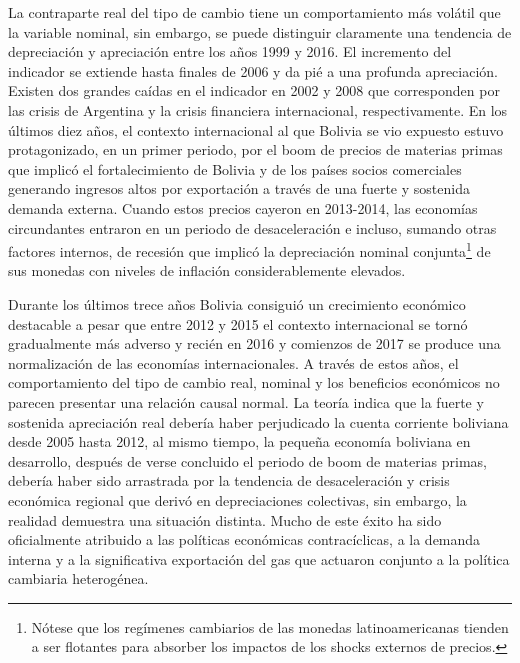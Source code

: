 \documentclass[12pt,letterpaper]{article}
\begin{document}
La contraparte real del tipo de cambio tiene un comportamiento más volátil que la variable nominal, sin embargo, se puede distinguir claramente una tendencia de depreciación y apreciación entre los años 1999 y 2016. El incremento del indicador se extiende hasta finales de 2006 y da pié a una profunda apreciación. Existen dos grandes caídas en el indicador en 2002 y 2008 que corresponden por las crisis de Argentina y la crisis financiera internacional, respectivamente. En los últimos diez años, el contexto internacional al que Bolivia se vio expuesto estuvo protagonizado, en un primer periodo, por el boom de precios de materias primas que implicó el fortalecimiento de Bolivia y de los países socios comerciales generando ingresos altos por exportación a través de una fuerte y sostenida demanda externa. Cuando estos precios cayeron en 2013-2014, las economías circundantes entraron en un periodo de desaceleración e incluso, sumando otras factores internos, de recesión que implicó la depreciación nominal conjunta\footnote{Nótese que los regímenes cambiarios de las monedas latinoamericanas tienden a ser flotantes para absorber los impactos de los shocks externos de precios.} de sus monedas con niveles de inflación considerablemente elevados. %

Durante los últimos trece años Bolivia consiguió un crecimiento económico destacable a pesar que entre 2012 y 2015 el contexto internacional se tornó gradualmente más adverso y recién en 2016 y comienzos de 2017 se produce una normalización de las economías internacionales. A través de estos años, el comportamiento del tipo de cambio real, nominal y los beneficios económicos no parecen presentar una relación causal normal. La teoría indica que la fuerte y sostenida apreciación real debería haber perjudicado la cuenta corriente boliviana desde 2005 hasta 2012, al mismo tiempo, la pequeña economía boliviana en desarrollo, después de verse concluido el periodo de boom de materias primas, debería haber sido arrastrada por la tendencia de desaceleración y crisis económica regional que derivó en depreciaciones colectivas, sin embargo, la realidad demuestra una situación distinta. Mucho de este éxito ha sido oficialmente atribuido a las políticas económicas contracíclicas, a la demanda interna y a la significativa exportación del gas que actuaron conjunto a la política cambiaria heterogénea.
\end{document}

